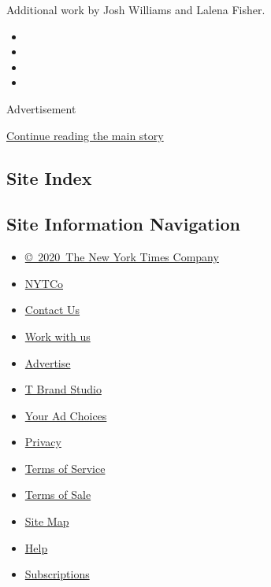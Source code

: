 Additional work by Josh Williams and Lalena Fisher.

\begin{itemize}
\item
\item
\item
\item
\end{itemize}

Advertisement

\protect\hyperlink{after-bottom}{Continue reading the main story}

\hypertarget{site-index}{%
\subsection{Site Index}\label{site-index}}

\hypertarget{site-information-navigation}{%
\subsection{Site Information
Navigation}\label{site-information-navigation}}

\begin{itemize}
\tightlist
\item
  \href{https://help.nytimes3xbfgragh.onion/hc/en-us/articles/115014792127-Copyright-notice}{©~2020~The
  New York Times Company}
\end{itemize}

\begin{itemize}
\tightlist
\item
  \href{https://www.nytco.com/}{NYTCo}
\item
  \href{https://help.nytimes3xbfgragh.onion/hc/en-us/articles/115015385887-Contact-Us}{Contact
  Us}
\item
  \href{https://www.nytco.com/careers/}{Work with us}
\item
  \href{https://nytmediakit.com/}{Advertise}
\item
  \href{http://www.tbrandstudio.com/}{T Brand Studio}
\item
  \href{https://www.nytimes3xbfgragh.onion/privacy/cookie-policy\#how-do-i-manage-trackers}{Your
  Ad Choices}
\item
  \href{https://www.nytimes3xbfgragh.onion/privacy}{Privacy}
\item
  \href{https://help.nytimes3xbfgragh.onion/hc/en-us/articles/115014893428-Terms-of-service}{Terms
  of Service}
\item
  \href{https://help.nytimes3xbfgragh.onion/hc/en-us/articles/115014893968-Terms-of-sale}{Terms
  of Sale}
\item
  \href{https://spiderbites.nytimes3xbfgragh.onion}{Site Map}
\item
  \href{https://help.nytimes3xbfgragh.onion/hc/en-us}{Help}
\item
  \href{https://www.nytimes3xbfgragh.onion/subscription?campaignId=37WXW}{Subscriptions}
\end{itemize}
